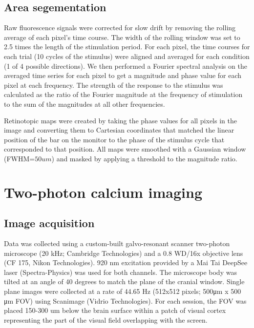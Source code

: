 \subsection{Area segementation}
Raw fluorescence signals were corrected for slow drift by removing the rolling average of each pixel’s time course. The width of the rolling window was set to 2.5 times the length of the stimulation period. For each pixel, the time courses for each trial (10 cycles of the stimulus) were aligned and averaged for each condition (1 of 4 possible directions). We then performed a Fourier spectral analysis on the averaged time series for each pixel to get a magnitude and phase value for each pixel at each frequency. The strength of the response to the stimulus was calculated as the ratio of the Fourier magnitude at the frequency of stimulation to the sum of the magnitudes at all other frequencies\cite{Kalatsky2003, Marshel2011, Juavinett2017}.

Retinotopic maps were created by taking the phase values for all pixels in the image and converting them to Cartesian coordinates that matched the linear position of the bar on the monitor to the phase of the stimulus cycle that corresponded to that position. All maps were smoothed with a Gaussian window (FWHM=$50um$) and masked by applying a threshold to the magnitude ratio.  

\section{Two-photon calcium imaging}
\subsection{Image acquisition}
Data was collected using a custom-built galvo-resonant scanner two-photon microscope (20 kHz; Cambridge Technologies) and a 0.8 WD/16x objective lens (CF 175, Nikon Technologies). 920 nm excitation provided by a Mai Tai DeepSee laser (Spectra-Physics) was used for both channels. The microscope body was tilted at an angle of 40 degrees to match the plane of the cranial window. Single plane images were collected at a rate of 44.65 Hz (512x512 pixels; 500μm x 500 μm FOV) using Scanimage (Vidrio Technologies). For each session, the FOV was placed
150-300 um below the brain surface within a patch of visual cortex representing the part of the
visual field overlapping with the screen.

